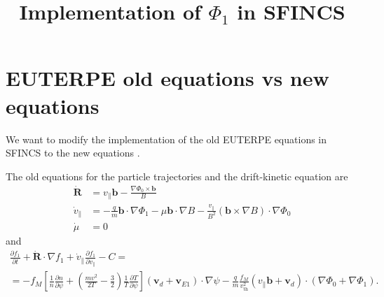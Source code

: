 \documentclass[12pt]{article}
\title{Implementation of $\Phi_1$ in SFINCS}
\newcommand{\p}{\partial}
\newcommand{\na}{\nabla}
\begin{document}
\titlepage

\maketitle

\section*{EUTERPE old equations vs new equations}
We want to modify the implementation of the old EUTERPE equations \cite{regana} in SFINCS 
to the new equations \cite{reganaArxiv}.

The old equations for the particle trajectories and the drift-kinetic equation are
\begin{align}
\dot{\bm{R}} & =  v_\| \bm{b} - \frac{\na \Phi_0 \times \bm{b}}{B}  \\
\dot{v}_\| & =  - \frac{q}{m} \bm{b} \cdot \na \Phi_1 - \mu \bm{b} \cdot \na B - \frac{v_\|}{B^2} \left(\bm{b} \times \na B\right) \cdot \na \Phi_0 \\
\dot{\mu} & =  0
\label{eq:ParticleTrajEuterpeOld}
\end{align}
and
\begin{multline}
\frac{\p f_1}{\p t} + \dot{\bm{R}} \cdot \na f_1 + \dot{v}_\| \frac{\p f_1}{\p v_\|} - C = \\ =
- f_M \left[\frac{1}{n} \frac{\p n}{\p \psi} + \left(\frac{m v^2}{2 T} - \frac{3}{2}\right) \frac{1}{T} \frac{\p T}{\p \psi}\right] 
\left(\bm{v}_d + \bm{v}_{E1}\right) \cdot \na \psi - 
\frac{q}{m} \frac{f_M}{v_{\mathrm{th}}^2} \left(v_\| \bm{b} + \bm{v}_d\right) \cdot \left(\na \Phi_0 + \na \Phi_1\right).
\label{eq:DriftKineticEuterpeOld}
\end{multline}
\end{document}
